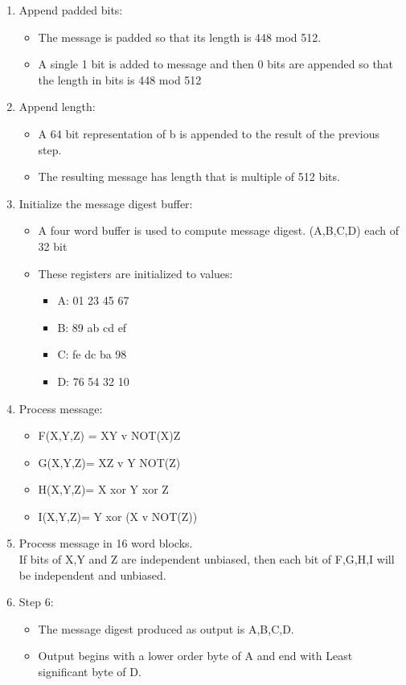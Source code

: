 \begin{enumerate}
\item Append padded bits:
\begin{itemize}
\item The message is padded so that its length is 448 mod 512.
\item  A single 1 bit is added to message and then 0 bits are appended so that the length in bits is 448 mod 512
\end{itemize}
\item Append length:
\begin{itemize}
\item  A 64 bit representation of b is appended to the result of the previous step.
\item  The resulting message has length that is multiple of 512 bits.
\end{itemize}
\item Initialize the message digest buffer:
\begin{itemize}
\item  A four word buffer is used to compute message digest. (A,B,C,D) each of 32 bit
\item These registers are initialized to values:
\begin{itemize}
\item  A: 01 23 45 67
\item  B: 89 ab cd ef
\item  C: fe dc ba 98
\item  D: 76 54 32 10
\end{itemize}
\end{itemize}
\item Process message:
\begin{itemize}
\item  F(X,Y,Z) = XY v NOT(X)Z
\item  G(X,Y,Z)= XZ v Y NOT(Z)
\item  H(X,Y,Z)= X xor Y xor Z
\item  I(X,Y,Z)= Y xor (X v NOT(Z))
\end{itemize}
\item  Process message in 16 word blocks.
\\ If bits of X,Y and Z are independent unbiased, then each bit of F,G,H,I will be independent and unbiased.
\item Step 6:
\begin{itemize}
\item  The message digest produced as output is A,B,C,D.
\item  Output begins with a lower order byte of A and end with Least significant byte of D.
\end{itemize}
\end{enumerate}
